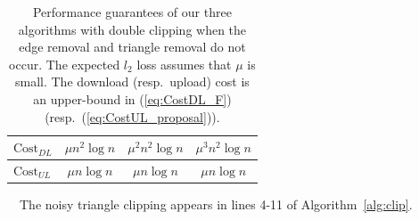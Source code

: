 \begin{table}[t]
\begin{tabular}{|l|c|c|c|}
    $\text{Cost}_{DL}$ & 
    $\mu n^2 \log n$ 
    & 
    $\mu^2 n^2 \log n$ 
    & 
    $\mu^3 n^2 \log n$ 
    \\ \hline
    $\text{Cost}_{UL}$ & 
    $\mu n \log n$ & $\mu n \log n$ & $\mu n \log n$ 
    \\ \hline
  \end{tabular}
  \vspace{-2mm}
  \caption{Performance guarantees 
  of our three algorithms with double clipping when the edge removal and triangle removal do not occur. 
  The expected $l_2$ loss assumes that $\mu$ is small. 
  The download (resp.~upload) cost is an upper-bound in (\ref{eq:CostDL_F}) 
  (resp.~(\ref{eq:CostUL_proposal})).
  }
  \label{tab:privacy_utility_cost}
\end{table}

\smallskip
{}~~The noisy triangle clipping appears in lines 4-11 of Algorithm~\ref{alg:clip}. 

